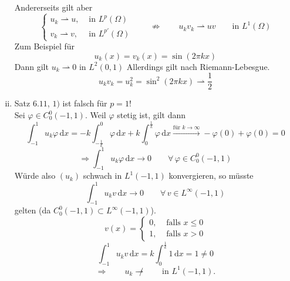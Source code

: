 \begin{bemerkung}
\begin{enumerate}[(i)]
\[		\]
		Andererseits gilt aber
		\[
			\begin{cases}
				u_k \rightharpoonup u, &\text{ in }L^p(\Omega)\\
				v_k \rightharpoonup v, &\text{ in }L^{p'}(\Omega)
			\end{cases} \qquad \not \Rightarrow \qquad  u_k v_k \rightharpoonup uv \qquad \text{in }L^1(\Omega)
		\]
		Zum Beispiel für 
		\[
			u_k(x) = v_k(x) = \sin(2 \pi k x) 
		\]
		Dann gilt $u_k \rightharpoonup 0$ in $L^2(0,1)$ Allerdings gilt nach Riemann-Lebesgue.
		\[
			u_k v_k = u_k^2 = \sin^2(2 \pi k x) \rightharpoonup \frac{1}{2}
		\]
		\item Satz $6.11$, $1)$ ist falsch für $p =1$!
		\\ Sei $\varphi \in C^0_0(-1,1)$. Weil $\varphi$ stetig ist, gilt dann
		\[
			\int_{-1}^{1} u_k \varphi \,\mathrm{d}x = -k \int_{- \frac{1}{k}}^{0} \varphi \,\mathrm{d}x + k \int_{0}^{\frac{1}{k}} \varphi \,\mathrm{d}x 
			\stackrel{\text{für }k \to \infty}{\to } - \varphi(0) + \varphi(0)= 0
		\]
		\[
			\Rightarrow \int_{-1}^{1}u_k \varphi \,\mathrm{d}x \to 0 \qquad \forall\, \varphi \in C^0_0(-1,1)
		\]
		Würde also $(u_k)$ schwach in $L^1(-1,1)$ konvergieren, so müsste 
		\[
			\int_{-1}^{1}u_k v \,\mathrm{d}x \to 0 \qquad \forall\, v \in L^{\infty}(-1,1)
		\]
		gelten (da $C^0_0(-1,1) \subset L^{\infty}(-1,1)$).
		\[
			v(x) = \begin{cases}
				0, &\text{ falls }x \leq 0\\
				1, &\text{ falls }x > 0
			\end{cases}
		\]
		\[
			\int_{-1}^{1}u_k v \,\mathrm{d}x = k \int_{0}^{\frac{1}{k}}1 \,\mathrm{d}x = 1 \neq 0
		\]
		\[
			\Rightarrow \qquad u_k \not \rightharpoonup \qquad \text{in }L^1(-1,1).
		\]
	\end{enumerate}
\end{bemerkung}
